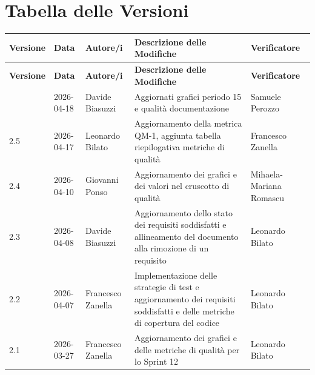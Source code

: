 \documentclass[a4paper,11pt,oneside]{scrartcl}
\begin{document}
\section*{Tabella delle Versioni}
\vspace{0.2cm}
{%
    \renewcommand{\arraystretch}{1.2}
    \setlength{\LTleft}{-0.4cm}
    \setlength{\LTright}{0pt}
    \begin{longtable}{@{}llp{}p{}p{}@{}}
        \toprule
        \textbf{Versione} & \textbf{Data} & \textbf{Autore/i}       & \textbf{Descrizione delle Modifiche}                                                                                                                     & \textbf{Verificatore}   \\
        \midrule
        \endfirsthead
        \toprule
        \textbf{Versione} & \textbf{Data} & \textbf{Autore/i}       & \textbf{Descrizione delle Modifiche}                                                                                                                     & \textbf{Verificatore}   \\
        \midrule
        \endhead
        \bottomrule
        \endfoot
        \bottomrule
        \endlastfoot
        2.6               & 2026-04-18    & Davide Biasuzzi         & Aggiornati grafici periodo 15 e qualità documentazione & Samuele Perozzo     \\
        2.5               & 2026-04-17    & Leonardo Bilato         & Aggiornamento della metrica QM-1, aggiunta tabella riepilogativa metriche di qualità                                                             & Francesco Zanella     \\
        2.4               & 2026-04-10    & Giovanni Ponso          & Aggiornamento dei grafici e dei valori nel cruscotto di qualità                                                                                          & Mihaela-Mariana Romascu \\
        2.3               & 2026-04-08    & Davide Biasuzzi         & Aggiornamento dello stato dei requisiti soddisfatti e allineamento del documento alla rimozione di un requisito                                          & Leonardo Bilato         \\
        2.2               & 2026-04-07    & Francesco Zanella       & Implementazione delle strategie di test e aggiornamento dei requisiti soddisfatti e delle metriche di copertura del codice                               & Leonardo Bilato         \\
        2.1               & 2026-03-27    & Francesco Zanella       & Aggiornamento dei grafici e delle metriche di qualità per lo Sprint 12                                                                                   & Leonardo Bilato         \\

\end{longtable}}
\end{document}
